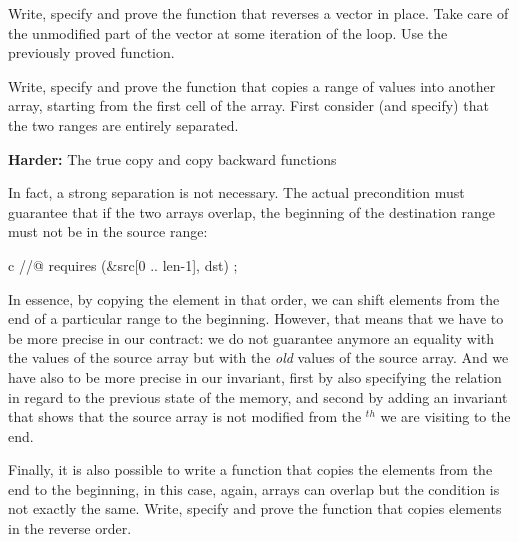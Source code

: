 Write, specify and prove the function that reverses a vector in place. Take
care of the unmodified part of the vector at some iteration of the loop.
Use the previously proved  function.






Write, specify and prove the function  that copies a range
of values into another array, starting from the first cell of the array.
First consider (and specify) that the two ranges are entirely separated.




\textbf{Harder:} The true copy and copy backward functions

In fact, a strong separation is not necessary. The actual precondition must
guarantee that if the two arrays overlap, the beginning of the destination
range must not be in the source range:

\begin{CodeBlock}{c}
//@ requires \separated(&src[0 .. len-1], dst) ;
\end{CodeBlock}


In essence, by copying the element in that order, we can shift elements from
the end of a particular range to the beginning. However, that means that we
have to be more precise in our contract: we do not guarantee anymore an equality
with the values of the source array but with the \emph{old} values of the
source array. And we have also to be more precise in our invariant, first by
also specifying the relation in regard to the previous state of the memory, and
second by adding an invariant that shows that the source array is not modified
from the $^{th}$ we are visiting to the end.


Finally, it is also possible to write a function that copies the elements from
the end to the beginning, in this case, again, arrays can overlap but the
condition is not exactly the same. Write, specify and prove the function
 that copies elements in the reverse order.
